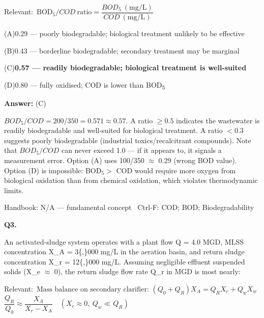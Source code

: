 \documentclass[11pt]{article}
\newcommand{\correct}[1]{\textbf{#1}\;{\color{accent}$\checkmark$}}
\newcommand{\optline}[2]{\par\noindent\hspace{1.2em}(#1)\hspace{0.6em}#2}
\begin{document}
{\small\color{soft}Relevant:}\ $\text{BOD}_5/COD\ \text{ratio} = \dfrac{BOD_5\ (\mathrm{mg/L})}{COD\ (\mathrm{mg/L})}$\par\vspace{3pt}
\optline{A}{0.29 --- poorly biodegradable; biological treatment unlikely to be effective}
\optline{B}{0.43 --- borderline biodegradable; secondary treatment may be marginal}
\optline{C}{\correct{0.57 --- readily biodegradable; biological treatment is well-suited}}
\optline{D}{0.80 --- fully oxidised; COD is lower than BOD\textsubscript{5}}
\par\vspace{3pt}
\vspace{2pt}\par\noindent\colorbox{boxbg}{\parbox{\dimexpr\linewidth-2\fboxsep\relax}{%
\vspace{2pt}\textbf{Answer:} (C)\par\vspace{2pt}
{\small $BOD_5/COD = 200/350 = 0.571\approx0.57$. A ratio $\geq 0.5$ indicates the wastewater is readily biodegradable and well-suited for biological treatment. A ratio $< 0.3$ suggests poorly biodegradable (industrial toxics/recalcitrant compounds). Note that $BOD_5/COD$ can never exceed 1.0 --- if it appears to, it signals a measurement error. Option (A) uses 100/350 $\approx$ 0.29 (wrong BOD value). Option (D) is impossible: BOD$_5 >$ COD would require more oxygen from biological oxidation than from chemical oxidation, which violates thermodynamic limits.}\par\vspace{2pt}
{\footnotesize\color{soft}Handbook: N/A --- fundamental concept \textbullet\ Ctrl-F: COD; BOD; Biodegradability}\vspace{2pt}
}}
\vspace{9pt}
\filbreak
\textbf{\color{accent}Q3.}\par\vspace{2pt}
An activated-sludge system operates with a plant flow Q = 4.0 MGD, MLSS concentration X\_A = 3\{,\}000 mg/L in the aeration basin, and return sludge concentration X\_r = 12\{,\}000 mg/L. Assuming negligible effluent suspended solids (X\_e $\approx$ 0), the return sludge flow rate Q\_r in MGD is most nearly:\par\vspace{3pt}
{\small\color{soft}Relevant:}\ $\text{Mass balance on secondary clarifier: }(Q_0+Q_R)X_A = Q_RX_r+Q_wX_w$ \quad $\dfrac{Q_R}{Q_0} \approx \dfrac{X_A}{X_r - X_A}\quad (X_e\approx 0,\ Q_w\ll Q_R)$\par\vspace{3pt}
\end{document}
